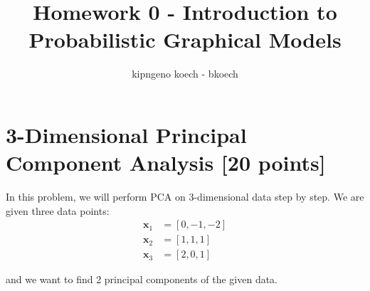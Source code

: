\documentclass[a3paper,12pt]{extarticle} %
\begin{document}
\author{kipngeno koech - bkoech}
\title{Homework 0 - Introduction to Probabilistic Graphical Models}   
\maketitle

\medskip

\maketitle

\section{ 3-Dimensional Principal Component Analysis [20 points]}

In this problem, we will perform PCA on 3-dimensional data step by step. We are given three data points:
\begin{align}
\mathbf{x}_1 &= [0, -1, -2]\\
\mathbf{x}_2 &= [1, 1, 1]\\
\mathbf{x}_3 &= [2, 0, 1]
\end{align}

and we want to find 2 principal components of the given data.
\end{document}
